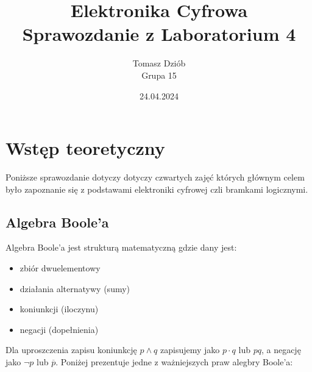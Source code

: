 \documentclass{article}
\begin{document}
  \pagestyle{fancy} %
  \fancyhf{} %
  \fancyfoot[C]{\thepage}
  \renewcommand{\headrulewidth}{0pt} %
  \renewcommand{\footrulewidth}{0.4pt} %
  \addtolength{\footskip}{0cm} %

  \title{Elektronika Cyfrowa \\ {\large Sprawozdanie z Laboratorium 4}}
  \date{24.04.2024}
  \author{Tomasz Dziób\\{\small Grupa 15}}
  \maketitle

  \setcounter{tocdepth}{4} %
  \setcounter{secnumdepth}{4} %
  \small \tableofcontents
  \pagebreak

  \section{Wstęp teoretyczny}
  Poniższe sprawozdanie dotyczy dotyczy czwartych zajęć których głównym celem było zapoznanie się z podstawami elektroniki cyfrowej czli bramkami logicznymi. 
    \subsection{Algebra Boole'a}
    Algebra Boole'a jest strukturą matematyczną gdzie dany jest:
    \begin{itemize}
      \item zbiór dwuelementowy
      \item działania alternatywy (sumy)
      \item koniunkcji (iloczynu)
      \item negacji (dopełnienia)
    \end{itemize}
    Dla uproszczenia zapisu koniunkcję $p \land q$ zapisujemy jako $p \cdot q$ lub $pq$, a negację jako $\lnot p$ lub $\overline{p}$. Poniżej prezentuje jedne z ważniejszych praw alegbry Boole'a:
\end{document}
